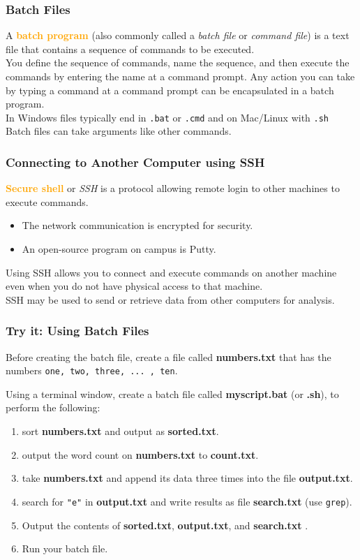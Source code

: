 \documentclass[xcolor=svgnames, colorlinks, handout]{beamer}
\newcommand{\nl}{\\[1em]}
\newcommand{\define}[1]{\textbf{\textcolor{orange}{#1}}}
\newcommand{\ft}[1]{\frametitle{#1}}
\begin{document}
\begin{frame}\ft{Batch Files}
A \define{batch program} (also commonly called a \emph{batch file} or \emph{command file}) is a text file that contains a sequence of commands to be executed.\nl

You define the sequence of commands, name the sequence, and then execute the commands by entering the name at a command prompt.  Any action you can take by typing a command at a command prompt can be encapsulated in a batch program. \nl

In Windows files typically end in {\tt.bat} or {\tt.cmd} and on Mac/Linux with {\tt.sh}\nl
Batch files can take arguments like other commands.

\end{frame}

\begin{frame}\ft{Connecting to Another Computer using SSH}
\define{Secure shell} or \emph{SSH} is a protocol allowing remote login to other machines to execute commands.
\begin{itemize}
\item The network communication is encrypted for security.
\item An open-source program on campus is Putty.\nl
\end{itemize}

Using SSH allows you to connect and execute commands on another machine even when you do not have physical access to that machine.\nl

SSH may be used to send or retrieve data from other computers for analysis.

\end{frame}

\begin{frame}[fragile]\ft{Try it: Using Batch Files}
Before creating the batch file, create a file called {\bf numbers.txt} that has the numbers {\tt one, two, three, ... , ten}.
\begin{example}
Using a terminal window, create a batch file called {\bf myscript.bat} (or {\bf .sh}), to perform the following:
\begin{enumerate}
\item  sort {\bf numbers.txt} and output as {\bf sorted.txt}.
\item output the word count on {\bf numbers.txt} to {\bf count.txt}.
\item take {\bf numbers.txt} and append its data three times into the file {\bf output.txt}.
\item search for \verb|"e"| in {\bf output.txt} and write results as file {\bf search.txt} (use {\tt grep}).
\item Output the contents of {\bf sorted.txt}, {\bf output.txt}, and {\bf search.txt} .
\item Run your batch file.
\end{enumerate}
\end{example}

\end{frame}
\end{document}
